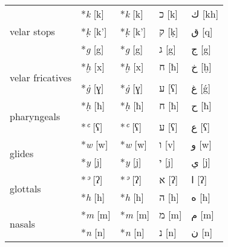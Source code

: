 \documentclass{article}
\begin{document}
\begin{tabular}{@{}lllll@{}}
  \midrule
  \multirow{3}{*}{velar stops}
  & \**\textit{k} [k]   & \**\textit{k} [k]   & \texthebrew{כ} [k] & \textarabic{ك} [kh] \\
  & \**\textit{ḳ} [k']  & \**\textit{ḳ} [k']  & \texthebrew{ק} [ḳ] & \textarabic{ق} [q]\\
  & \**\textit{g} [g]   & \**\textit{g} [g]   & \texthebrew{ג} [g] & \textarabic{ج} [g] \\
  \midrule
  \multirow{3}{*}{velar fricatives}
  & \**\textit{ḫ} [x]   & \**\textit{ḫ} [x]   & \texthebrew{ח} [ħ] & \textarabic{خ} [ḫ]\\
  \\
  & \**\textit{ġ} [ɣ]   & \**\textit{ġ} [ɣ]   & \texthebrew{ע} [ʕ] & \textarabic{غ} [\'{g}] \\
  \midrule
  \multirow{3}{*}{pharyngeals}
  & \**\textit{ḥ} [ħ]   & \**\textit{ḥ} [ħ]   & \texthebrew{ח} [ħ] & \textarabic{ح} [ħ] \\
  \\
  & \**\textit{ʿ} [ʕ]   & \**\textit{ʿ} [ʕ]   & \texthebrew{ע} [ʕ] & \textarabic{ع} [ʕ] \\
  \midrule
  \multirow{2}{*}{glides}
  & \**\textit{w} [w]   & \**\textit{w} [w]   & \texthebrew{ו} [v] & \textarabic{و} [w]\\
  & \**\textit{y} [j]   & \**\textit{y} [j]   & \texthebrew{י} [j] & \textarabic{ي} [j]\\
  \midrule
  \multirow{2}{*}{glottals}
  & \**\textit{ʾ} [ʔ]   & \**\textit{ʾ} [ʔ]   & \texthebrew{א} [ʔ] & \textarabic{ا} [ʔ] \\
  & \**\textit{h} [h]   & \**\textit{h} [h]   & \texthebrew{ה} [h] & \textarabic{ه} [h] \\
  \midrule
  \multirow{2}{*}{nasals}
  & \**\textit{m} [m]   & \**\textit{m} [m]   & \texthebrew{מ} [m] & \textarabic{م} [m]\\
  & \**\textit{n} [n]   & \**\textit{n} [n]   & \texthebrew{נ} [n] & \textarabic{ن} [n]\\
  \bottomrule
\end{tabular}
\end{document}
